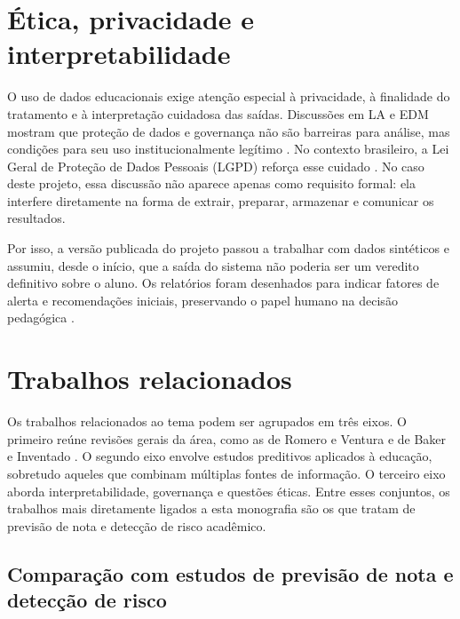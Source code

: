 \section{\'Etica, privacidade e interpretabilidade}
\label{sec:etica-privacidade-interpretabilidade}

O uso de dados educacionais exige aten\c{c}\~ao especial \`a privacidade, \`a finalidade do tratamento e \`a interpreta\c{c}\~ao cuidadosa das sa\'idas. Discuss\~oes em LA e EDM mostram que prote\c{c}\~ao de dados e governan\c{c}a n\~ao s\~ao barreiras para an\'alise, mas condi\c{c}\~oes para seu uso institucionalmente leg\'itimo \cite{slade2013,gasevic2016,khalil2016}. No contexto brasileiro, a Lei Geral de Prote\c{c}\~ao de Dados Pessoais (LGPD) refor\c{c}a esse cuidado \cite{lgpd}. No caso deste projeto, essa discuss\~ao n\~ao aparece apenas como requisito formal: ela interfere diretamente na forma de extrair, preparar, armazenar e comunicar os resultados.

Por isso, a vers\~ao publicada do projeto passou a trabalhar com dados sintéticos e assumiu, desde o in\'icio, que a sa\'ida do sistema n\~ao poderia ser um veredito definitivo sobre o aluno. Os relat\'orios foram desenhados para indicar fatores de alerta e recomenda\c{c}\~oes iniciais, preservando o papel humano na decis\~ao pedag\'ogica \cite{fiok2022}.

\section{Trabalhos relacionados}
\label{sec:trabalhos-relacionados}

Os trabalhos relacionados ao tema podem ser agrupados em tr\^es eixos. O primeiro re\'une revis\~oes gerais da \'area, como as de Romero e Ventura \cite{romero2010} e de Baker e Inventado \cite{baker2014}. O segundo eixo envolve estudos preditivos aplicados \`a educa\c{c}\~ao, sobretudo aqueles que combinam m\'ultiplas fontes de informa\c{c}\~ao. O terceiro eixo aborda interpretabilidade, governan\c{c}a e quest\~oes \'eticas. Entre esses conjuntos, os trabalhos mais diretamente ligados a esta monografia s\~ao os que tratam de previs\~ao de nota e detec\c{c}\~ao de risco acad\^emico.

\subsection{Compara\c{c}\~ao com estudos de previs\~ao de nota e detec\c{c}\~ao de risco}
\label{subsec:comparacao-trabalhos}

